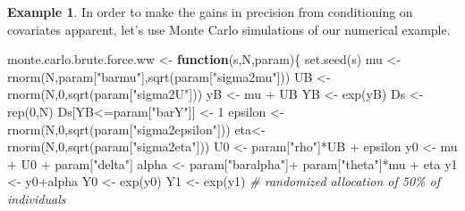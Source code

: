 \documentclass[
]{book}
\newenvironment{Shaded}{\begin{snugshade}}{\end{snugshade}}
\newcommand{\CommentTok}[1]{\textcolor[rgb]{0.56,0.35,0.01}{\textit{#1}}}
\newcommand{\ControlFlowTok}[1]{\textcolor[rgb]{0.13,0.29,0.53}{\textbf{#1}}}
\newcommand{\DecValTok}[1]{\textcolor[rgb]{0.00,0.00,0.81}{#1}}
\newcommand{\FunctionTok}[1]{\textcolor[rgb]{0.00,0.00,0.00}{#1}}
\newcommand{\NormalTok}[1]{#1}
\newcommand{\OtherTok}[1]{\textcolor[rgb]{0.56,0.35,0.01}{#1}}
\newcommand{\SpecialCharTok}[1]{\textcolor[rgb]{0.00,0.00,0.00}{#1}}
\newcommand{\StringTok}[1]{\textcolor[rgb]{0.31,0.60,0.02}{#1}}
\theoremstyle{definition}
\theoremstyle{definition}
\newtheorem{example}{Example}[chapter]
\theoremstyle{definition}
\theoremstyle{definition}
\theoremstyle{remark}
\begin{document}
\begin{example}
\protect\hypertarget{exm:unnamed-chunk-74}{}{\label{exm:unnamed-chunk-74} }In order to make the gains in precision from conditioning on covariates apparent, let's use Monte Carlo simulations of our numerical example.
\end{example}

\begin{Shaded}
\begin{Highlighting}[]
\NormalTok{monte.carlo.brute.force.ww }\OtherTok{\textless{}{-}} \ControlFlowTok{function}\NormalTok{(s,N,param)\{}
  \FunctionTok{set.seed}\NormalTok{(s)}
\NormalTok{  mu }\OtherTok{\textless{}{-}} \FunctionTok{rnorm}\NormalTok{(N,param[}\StringTok{"barmu"}\NormalTok{],}\FunctionTok{sqrt}\NormalTok{(param[}\StringTok{"sigma2mu"}\NormalTok{]))}
\NormalTok{  UB }\OtherTok{\textless{}{-}} \FunctionTok{rnorm}\NormalTok{(N,}\DecValTok{0}\NormalTok{,}\FunctionTok{sqrt}\NormalTok{(param[}\StringTok{"sigma2U"}\NormalTok{]))}
\NormalTok{  yB }\OtherTok{\textless{}{-}}\NormalTok{ mu }\SpecialCharTok{+}\NormalTok{ UB }
\NormalTok{  YB }\OtherTok{\textless{}{-}} \FunctionTok{exp}\NormalTok{(yB)}
\NormalTok{  Ds }\OtherTok{\textless{}{-}} \FunctionTok{rep}\NormalTok{(}\DecValTok{0}\NormalTok{,N)}
\NormalTok{  Ds[YB}\SpecialCharTok{\textless{}=}\NormalTok{param[}\StringTok{"barY"}\NormalTok{]] }\OtherTok{\textless{}{-}} \DecValTok{1} 
\NormalTok{  epsilon }\OtherTok{\textless{}{-}} \FunctionTok{rnorm}\NormalTok{(N,}\DecValTok{0}\NormalTok{,}\FunctionTok{sqrt}\NormalTok{(param[}\StringTok{"sigma2epsilon"}\NormalTok{]))}
\NormalTok{  eta}\OtherTok{\textless{}{-}} \FunctionTok{rnorm}\NormalTok{(N,}\DecValTok{0}\NormalTok{,}\FunctionTok{sqrt}\NormalTok{(param[}\StringTok{"sigma2eta"}\NormalTok{]))}
\NormalTok{  U0 }\OtherTok{\textless{}{-}}\NormalTok{ param[}\StringTok{"rho"}\NormalTok{]}\SpecialCharTok{*}\NormalTok{UB }\SpecialCharTok{+}\NormalTok{ epsilon}
\NormalTok{  y0 }\OtherTok{\textless{}{-}}\NormalTok{ mu }\SpecialCharTok{+}\NormalTok{  U0 }\SpecialCharTok{+}\NormalTok{ param[}\StringTok{"delta"}\NormalTok{]}
\NormalTok{  alpha }\OtherTok{\textless{}{-}}\NormalTok{ param[}\StringTok{"baralpha"}\NormalTok{]}\SpecialCharTok{+}\NormalTok{  param[}\StringTok{"theta"}\NormalTok{]}\SpecialCharTok{*}\NormalTok{mu }\SpecialCharTok{+}\NormalTok{ eta}
\NormalTok{  y1 }\OtherTok{\textless{}{-}}\NormalTok{ y0}\SpecialCharTok{+}\NormalTok{alpha}
\NormalTok{  Y0 }\OtherTok{\textless{}{-}} \FunctionTok{exp}\NormalTok{(y0)}
\NormalTok{  Y1 }\OtherTok{\textless{}{-}} \FunctionTok{exp}\NormalTok{(y1)}
  \CommentTok{\# randomized allocation of 50\% of individuals}

\end{Highlighting}
\end{Shaded}
\end{document}
